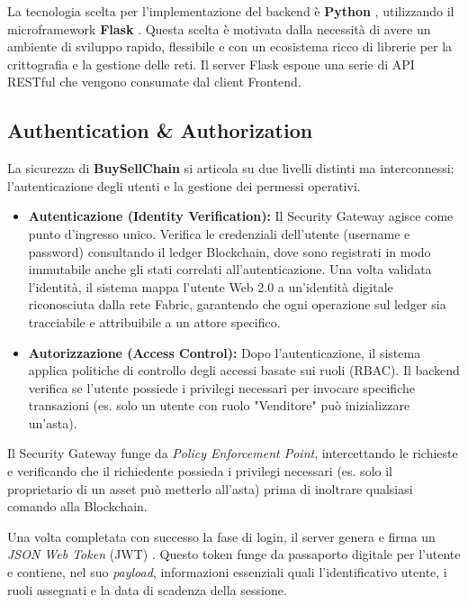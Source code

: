 La tecnologia scelta per l'implementazione del backend è \textbf{Python} \cite{python_software_foundation}, utilizzando il microframework \textbf{Flask} \cite{pallets_flask,flask_jwt_extended}. Questa scelta è motivata dalla necessità di avere un ambiente di sviluppo rapido, flessibile e con un ecosistema ricco di librerie per la crittografia e la gestione delle reti. Il server Flask espone una serie di API RESTful che vengono consumate dal client Frontend.

\subsection{Authentication \& Authorization}

La sicurezza di \textbf{BuySellChain} si articola su due livelli distinti ma interconnessi: l'autenticazione degli utenti e la gestione dei permessi operativi.

\begin{itemize}
    \item \textbf{Autenticazione (Identity Verification):} Il Security Gateway agisce come punto d'ingresso unico. Verifica le credenziali dell'utente (username e password) consultando il ledger Blockchain, dove sono registrati in modo immutabile anche gli stati correlati all'autenticazione. Una volta validata l'identità, il sistema mappa l'utente Web 2.0 a un'identità digitale riconosciuta dalla rete Fabric, garantendo che ogni operazione sul ledger sia tracciabile e attribuibile a un attore specifico.
    \item \textbf{Autorizzazione (Access Control):} Dopo l'autenticazione, il sistema applica politiche di controllo degli accessi basate sui ruoli (RBAC). Il backend verifica se l'utente possiede i privilegi necessari per invocare specifiche transazioni (es. solo un utente con ruolo "Venditore" può inizializzare un'asta).
\end{itemize}
    
Il Security Gateway funge da \textit{Policy Enforcement Point}, intercettando le richieste e verificando che il richiedente possieda i privilegi necessari (es. solo il proprietario di un asset può metterlo all'asta) prima di inoltrare qualsiasi comando alla Blockchain.

Una volta completata con successo la fase di login, il server genera e firma un \textit{JSON Web Token} (JWT) \cite{JWTrfc7519}. Questo token funge da passaporto digitale per l'utente e contiene, nel suo \textit{payload}, informazioni essenziali quali l'identificativo utente, i ruoli assegnati e la data di scadenza della sessione.

